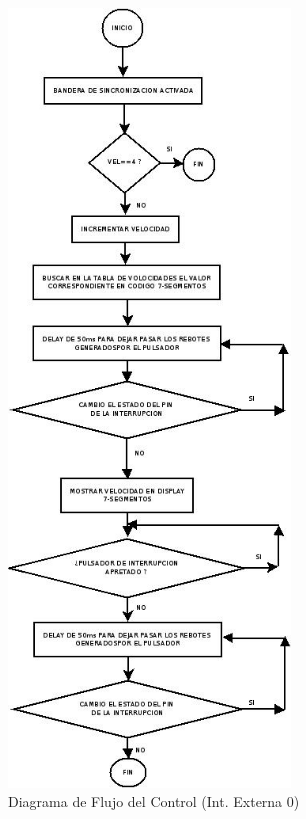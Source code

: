 \documentclass[a4paper,10pt]{article}
\begin{document}
					\newpage
					\begin{figure}[!htb]
						\centering
						\includegraphics[width=7.5cm]{Imagenes/DiagFlujoControl3.jpg}
						\caption{Diagrama de Flujo del Control (Int. Externa 0)} \label{ControlFlujo2}
					\end{figure}
			
\end{document}
